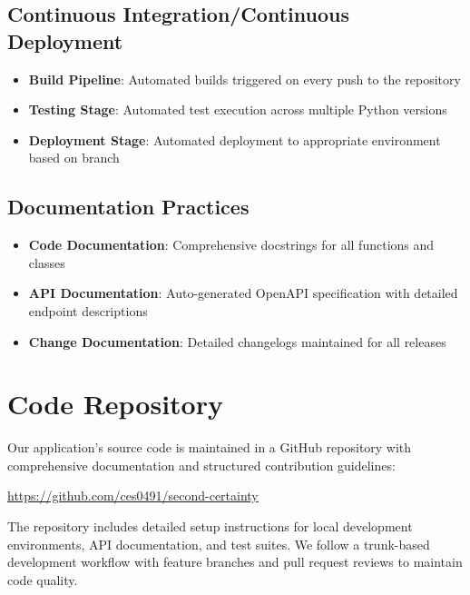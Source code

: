 \documentclass[
  11pt,
  letterpaper,
]{article}
\providecommand{\tightlist}{%
  \setlength{\itemsep}{0pt}\setlength{\parskip}{0pt}}\usepackage{longtable,booktabs,array}
\begin{document}
\hypertarget{continuous-integrationcontinuous-deployment}{%
\subsection{Continuous Integration/Continuous
Deployment}\label{continuous-integrationcontinuous-deployment}}

\begin{itemize}
\tightlist
\item
  \textbf{Build Pipeline}: Automated builds triggered on every push to
  the repository
\item
  \textbf{Testing Stage}: Automated test execution across multiple
  Python versions
\item
  \textbf{Deployment Stage}: Automated deployment to appropriate
  environment based on branch
\end{itemize}

\hypertarget{documentation-practices}{%
\subsection{Documentation Practices}\label{documentation-practices}}

\begin{itemize}
\tightlist
\item
  \textbf{Code Documentation}: Comprehensive docstrings for all
  functions and classes
\item
  \textbf{API Documentation}: Auto-generated OpenAPI specification with
  detailed endpoint descriptions
\item
  \textbf{Change Documentation}: Detailed changelogs maintained for all
  releases
\end{itemize}

\hypertarget{code-repository}{%
\section{Code Repository}\label{code-repository}}

Our application's source code is maintained in a GitHub repository with
comprehensive documentation and structured contribution guidelines:

\url{https://github.com/ces0491/second-certainty}

The repository includes detailed setup instructions for local
development environments, API documentation, and test suites. We follow
a trunk-based development workflow with feature branches and pull
request reviews to maintain code quality.
\end{document}
